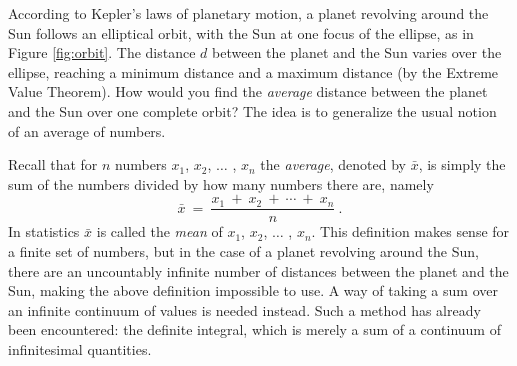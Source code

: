 According to Kepler's laws of planetary motion, a planet revolving around the
Sun follows an elliptical orbit, with the Sun at one focus of the ellipse,
as in Figure \ref{fig:orbit}. The distance $d$ between the planet and the Sun
varies over the ellipse, reaching a minimum distance and a maximum distance (by
the Extreme Value Theorem). How would you find the \emph{average} distance
between the planet and the Sun over one complete orbit? The idea is to generalize the usual notion
of an average of numbers.

Recall that for $n$ numbers $x_1$, $x_2$, $\ldots$ , $x_n$ the \emph{average},
denoted by $\bar{x}$, is simply the sum of the numbers divided by how many
numbers there are, namely
\[
\bar{x} ~=~ \frac{x_1 ~+~ x_2 ~+~ \cdots ~+~ x_n}{n} ~.
\]
In statistics $\bar{x}$ is called the \emph{mean} of $x_1$, $x_2$, $\ldots$ ,
$x_n$. This definition makes sense for a finite set of numbers, but in the case
of a planet revolving around the Sun, there are an uncountably infinite number
of distances between the planet and the Sun, making the above definition
impossible to use. A way of taking a sum over an infinite continuum of values is
needed instead. Such a method has already been encountered: the definite
integral, which is merely a sum of a continuum of infinitesimal quantities.

